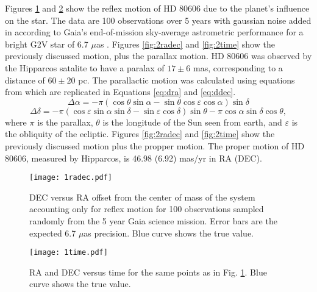 \documentclass[preprint]{aastex}
\begin{document}
Figures \ref{fig:1radec} and \ref{fig:1time} show the reflex motion of HD 80606 due to the planet's influence on the star. The data are 100 observations over 5 years with gaussian noise added in according to Gaia's end-of-mission sky-average astrometric performance for a bright G2V star of 6.7 $\mu$as \citep{gaia}. 
Figures \ref{fig:2radec} and \ref{fig:2time} show the previously discussed motion, plus the parallax motion. HD 80606 was observed by the Hipparcos satalite to have a paralax of $17\pm6$ mas, corresponding to a distance of $60\pm20$ pc. The parallactic motion was calculated using equations from \citet{parallax} which are replicated in Equations \ref{eq:dra} and \ref{eq:ddec}. 
\begin{equation}
    \Delta\alpha=-\pi(\cos\theta\sin\alpha-\sin\theta\cos\varepsilon\cos\alpha)\sin\delta
    \label{eq:dra}
\end{equation}
\begin{equation}
    \Delta\delta=-\pi(\cos\varepsilon\sin\alpha\sin\delta-\sin\varepsilon\cos\delta)\sin\theta-\pi\cos\alpha\sin\delta\cos\theta,
    \label{eq:ddec}
\end{equation}
where $\pi$ is the parallax, $\theta$ is the longitude of the Sun seen from earth, and $\varepsilon$ is the obliquity of the ecliptic.
Figures \ref{fig:2radec} and \ref{fig:2time} show the previously discussed motion plus the propper motion. The proper motion of HD 80606, measured by Hipparcos, is 46.98 (6.92) mas/yr in RA (DEC).

\begin{figure}
\begin{center}
    \texttt{[image: 1radec.pdf]}
    \caption{DEC versus RA offset from the center of mass of the system accounting only for reflex motion for 100 observations sampled randomly from the 5 year Gaia science mission. Error bars are the expected 6.7 $\mu$as precision. Blue curve shows the true value.}
    \label{fig:1radec}
\end{center}
\end{figure}

\begin{figure}
\begin{center}
    \texttt{[image: 1time.pdf]}
    \caption{RA and DEC versus time for the same points as in Fig. \ref{fig:1radec}. Blue curve shows the true value.}
    \label{fig:1time}
\end{center}
\end{figure}
\end{document}
